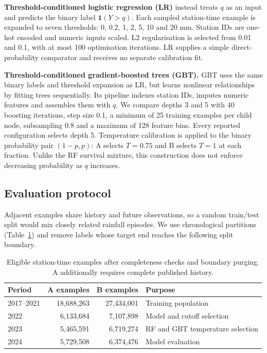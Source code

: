 \textbf{Threshold-conditioned logistic regression (LR)} instead treats $q$ as an input and predicts the binary label $\mathbf1(Y>q)$. Each sampled station-time example is expanded to seven thresholds: 0, 0.2, 1, 2, 5, 10 and 20 mm. Station IDs are one-hot encoded and numeric inputs scaled. L2 regularisation is selected from 0.01 and 0.1, with at most 100 optimisation iterations. LR supplies a simple direct-probability comparator and receives no separate calibration fit.

\textbf{Threshold-conditioned gradient-boosted trees (GBT).} GBT uses the same binary labels and threshold expansion as LR, but learns nonlinear relationships by fitting trees sequentially. Its pipeline indexes station IDs, imputes numeric features and assembles them with $q$. We compare depths 3 and 5 with 40 boosting iterations, step size 0.1, a minimum of 25 training examples per child node, subsampling 0.8 and a maximum of 128 feature bins. Every reported configuration selects depth 5. Temperature calibration is applied to the binary probability pair $(1-p,p)$: A selects $T=0.75$ and B selects $T=1$ at each fraction. Unlike the RF survival mixture, this construction does not enforce decreasing probability as $q$ increases.

\subsection{Evaluation protocol}
Adjacent examples share history and future observations, so a random train/test split would mix closely related rainfall episodes. We use chronological partitions (Table~\ref{tab:t2splits}) and remove labels whose target end reaches the following split boundary.
\begin{table}[htbp]\centering\small
\begin{tabular}{lrrp{.29\linewidth}}\toprule
Period & A examples & B examples & Purpose\\\midrule
2017--2021 & 18,688,263 & 27,434,001 & Training population \\
2022 & 6,133,684 & 7,107,898 & Model and cutoff selection \\
2023 & 5,465,591 & 6,719,274 & RF and GBT temperature selection \\
2024 & 5,729,508 & 6,374,476 & Model evaluation \\
\bottomrule\end{tabular}
\caption{Eligible station-time examples after completeness checks and boundary purging. A additionally requires complete published history.}\label{tab:t2splits}
\end{table}

